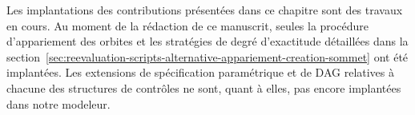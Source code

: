 Les implantations des contributions présentées dans ce chapitre sont des travaux en cours. %
Au moment de la rédaction de ce manuscrit, seules la procédure d'appariement des
orbites et les stratégies de degré d'exactitude détaillées dans la
section~\ref{sec:reevaluation-scripts-alternative-appariement-creation-sommet}
ont été implantées. %
Les extensions de spécification paramétrique et de DAG relatives à chacune des
structures de contrôles ne sont, quant à elles, pas encore implantées dans notre
modeleur. %

